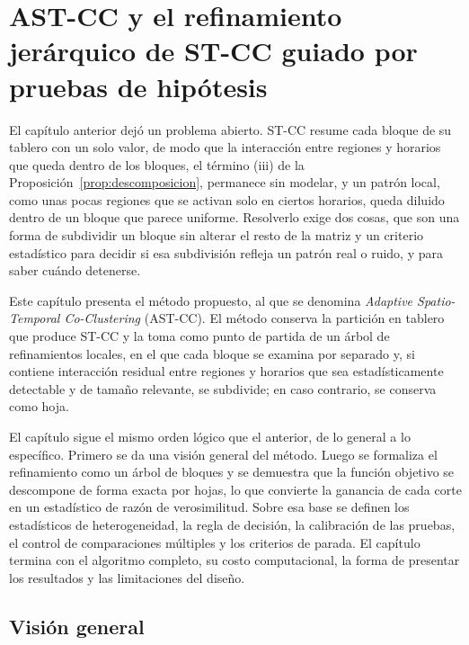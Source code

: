 
\chapter{AST-CC y el refinamiento jerárquico de ST-CC guiado por pruebas de hipótesis}\label{chap:propuesta}

El capítulo anterior dejó un problema abierto. ST-CC resume cada bloque de su
tablero con un solo valor, de modo que la interacción entre regiones y horarios
que queda dentro de los bloques, el término (iii) de la
Proposición~\ref{prop:descomposicion}, permanece sin modelar, y un patrón local,
como unas pocas regiones que se activan solo en ciertos horarios, queda diluido
dentro de un bloque que parece uniforme. Resolverlo exige dos cosas, que son una
forma de subdividir un bloque sin alterar el resto de la matriz y un criterio
estadístico para decidir si esa subdivisión refleja un patrón real o ruido, y para
saber cuándo detenerse.

Este capítulo presenta el método propuesto, al que se denomina \emph{Adaptive
Spatio-Temporal Co-Clustering} (AST-CC). El método conserva la partición en
tablero que produce ST-CC y la toma como punto de partida de un árbol de
refinamientos locales, en el que cada bloque se examina por separado y, si contiene
interacción residual entre regiones y horarios que sea estadísticamente
detectable y de tamaño relevante, se subdivide; en caso contrario, se conserva
como hoja.

El capítulo sigue el mismo orden lógico que el anterior, de lo general a lo
específico. Primero se da una visión general del método. Luego se formaliza el
refinamiento como un árbol de bloques y se demuestra que la función objetivo se
descompone de forma exacta por hojas, lo que convierte la ganancia de cada corte
en un estadístico de razón de verosimilitud. Sobre esa base se definen los
estadísticos de heterogeneidad, la regla de decisión, la calibración de las
pruebas, el control de comparaciones múltiples y los criterios de parada. El
capítulo termina con el algoritmo completo, su costo computacional, la forma de
presentar los resultados y las limitaciones del diseño.

\section{Visión general}\label{sec:prop-vision}

